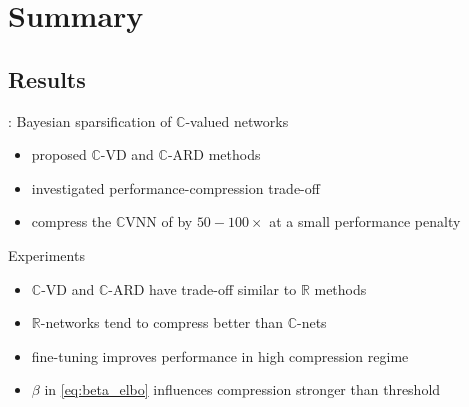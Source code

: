 \documentclass{beamer}
\newcommand{\real}{\mathbb{R}}
\newcommand{\cplx}{\mathbb{C}}
\begin{document}

\section{Summary} %
\label{sec:summary}

\subsection{Results} %
\label{sub:results}

\begin{frame}[c]{\insertsection: \insertsubsection}
  Bayesian sparsification of $\cplx$-valued networks
  \begin{itemize}
    \item proposed $\cplx$-VD and $\cplx$-ARD methods
    \item investigated performance-compression trade-off
    \item compress the $\cplx$VNN of \citet{trabelsi_deep_2018}
    by $50-100\times$ at a small performance penalty
  \end{itemize}

  \pause
  \medskip
  Experiments
  \begin{itemize}
    \item $\cplx$-VD and $\cplx$-ARD have trade-off similar to $\real$ methods
    \smallskip
    \item $\real$-networks tend to compress better than $\cplx$-nets
    \smallskip
    \item fine-tuning improves performance in high compression regime
    \smallskip
    \item $\beta$ in \ref{eq:beta_elbo} influences compression stronger than threshold
  \end{itemize}


\end{frame}
\end{document}
